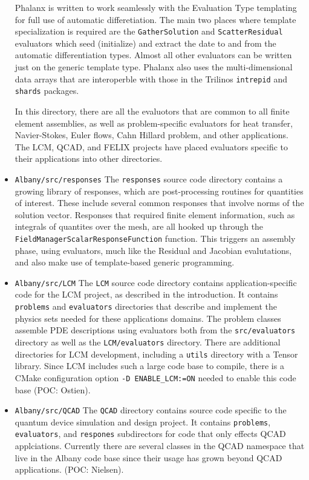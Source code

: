 \documentclass[pdf,12pt,report,strict]{SANDreport}
\theoremstyle{remark}
\begin{document}
\begin{itemize}
Phalanx is written to work seamlessly with the Evaluation Type templating for full
use of automatic differetiation. The main two places where template specialization is
required are the \texttt{GatherSolution} and \texttt{ScatterResidual} evaluators which
seed (initialize) and extract the date to and from the automatic differentiation types.
Almost all other evaluators can be written just on the generic template type.
Phalanx also uses the multi-dimensional data arrays that are interoperble with those in the
Trilinos \texttt{intrepid} and \texttt{shards} packages.

In this directory, there are all the evaluotors that are common to all finite element
assemblies, as well as problem-specific evaluators for heat transfer, Navier-Stokes, 
Euler flows, Cahn Hillard problem, and other applications. The LCM, QCAD, and
FELIX projects have placed evaluators specific to their applications into 
other directories.

\item{\texttt{Albany/src/responses}}  The \texttt{responses} source code directory contains
a growing library of responses, which are post-processing routines for quantities of interest.
These include several common responses that involve norms of the solution vector. 
Responses that required finite element information, such as integrals of quantites
over the mesh, are all hooked up through the
\texttt{FieldManagerScalarResponseFunction} function. This triggers an assembly
phase, using evaluators, much like the Residual and Jacobian evalutations, and 
also make use of template-based generic programming.

\item{\texttt{Albany/src/LCM}}  The \texttt{LCM} source code directory contains 
application-specific code for the LCM project, as described in the introduction. It contains
\texttt{problems} and \texttt{evaluators} directories that describe and implement
the physics sets needed for these applications domains. The problem classes assemble
PDE descriptions using evaluators both from the \texttt{src/evaluators} directory as
well as the \texttt{LCM/evaluators} directory. There are additional
directories for LCM development, including a \texttt{utils} directory with a Tensor
library. Since LCM includes such a large code base to compile, there is a CMake configuration 
option \texttt{-D ENABLE\_LCM:=ON} needed to enable this code base (POC: Ostien).

\item{\texttt{Albany/src/QCAD}}  The \texttt{QCAD} directory contains source code specific
to the quantum device simulation and design project. It contains \texttt{problems}, 
\texttt{evaluators}, and \texttt{respones} subdirectors for code that only effects
QCAD applciations. Currently there are several classes in the QCAD namespace that live
in the Albany code base since their usage has grown beyond QCAD applications.
(POC: Nielsen). 


\end{itemize}
\end{document}

